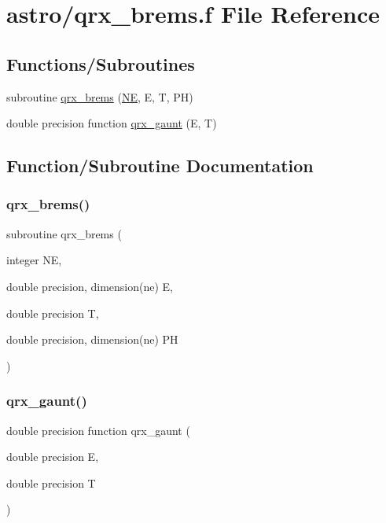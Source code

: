 \hypertarget{qrx__brems_8f}{}\section{astro/qrx\+\_\+brems.f File Reference}
\label{qrx__brems_8f}
\subsection*{Functions/\+Subroutines}
\begin{DoxyCompactItemize}
\item 
subroutine \hyperlink{qrx__brems_8f_a383dae7b4a4abe2b8495b38479369263}{qrx\+\_\+brems} (\hyperlink{eval__tab_8h_a5af9139e882aef6c820ae908589a40d6}{NE}, E, T, PH)
\item 
double precision function \hyperlink{qrx__brems_8f_af080da77c4cbf72f12fa1b167e1033e6}{qrx\+\_\+gaunt} (E, T)
\end{DoxyCompactItemize}


\subsection{Function/\+Subroutine Documentation}
\mbox{\label{qrx__brems_8f_a383dae7b4a4abe2b8495b38479369263}} 
\subsubsection{\texorpdfstring{qrx\+\_\+brems()}{qrx\_brems()}}
{\footnotesize\ttfamily subroutine qrx\+\_\+brems (\begin{DoxyParamCaption}\item[{integer}]{NE,  }\item[{double precision, dimension(ne)}]{E,  }\item[{double precision}]{T,  }\item[{double precision, dimension(ne)}]{PH }\end{DoxyParamCaption})}

\mbox{\label{qrx__brems_8f_af080da77c4cbf72f12fa1b167e1033e6}} 
\subsubsection{\texorpdfstring{qrx\+\_\+gaunt()}{qrx\_gaunt()}}
{\footnotesize\ttfamily double precision function qrx\+\_\+gaunt (\begin{DoxyParamCaption}\item[{double precision}]{E,  }\item[{double precision}]{T }\end{DoxyParamCaption})}

